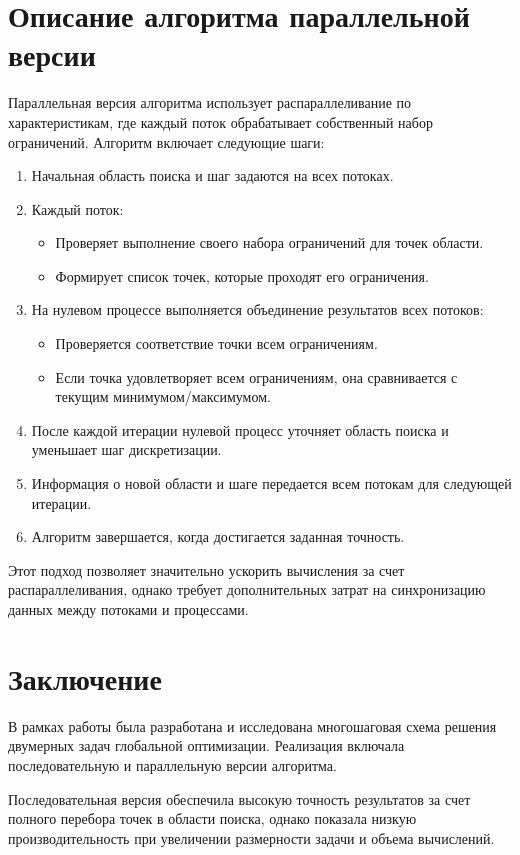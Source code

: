 \documentclass[a4paper,12pt]{article}
\begin{document}
\section*{Описание алгоритма параллельной версии}
Параллельная версия алгоритма использует распараллеливание по характеристикам, где каждый поток обрабатывает собственный набор ограничений. Алгоритм включает следующие шаги:
\begin{enumerate}
    \item Начальная область поиска и шаг задаются на всех потоках.
    \item Каждый поток:
    \begin{itemize}
        \item Проверяет выполнение своего набора ограничений для точек области.
        \item Формирует список точек, которые проходят его ограничения.
    \end{itemize}
    \item На нулевом процессе выполняется объединение результатов всех потоков:
    \begin{itemize}
        \item Проверяется соответствие точки всем ограничениям.
        \item Если точка удовлетворяет всем ограничениям, она сравнивается с текущим минимумом/максимумом.
    \end{itemize}
    \item После каждой итерации нулевой процесс уточняет область поиска и уменьшает шаг дискретизации.
    \item Информация о новой области и шаге передается всем потокам для следующей итерации.
    \item Алгоритм завершается, когда достигается заданная точность.
\end{enumerate}

Этот подход позволяет значительно ускорить вычисления за счет распараллеливания, однако требует дополнительных затрат на синхронизацию данных между потоками и процессами.

\newpage
\section*{Заключение}
В рамках работы была разработана и исследована многошаговая схема решения двумерных задач глобальной оптимизации. Реализация включала последовательную и параллельную версии алгоритма.

Последовательная версия обеспечила высокую точность результатов за счет полного перебора точек в области поиска, однако показала низкую производительность при увеличении размерности задачи и объема вычислений.
\end{document}
